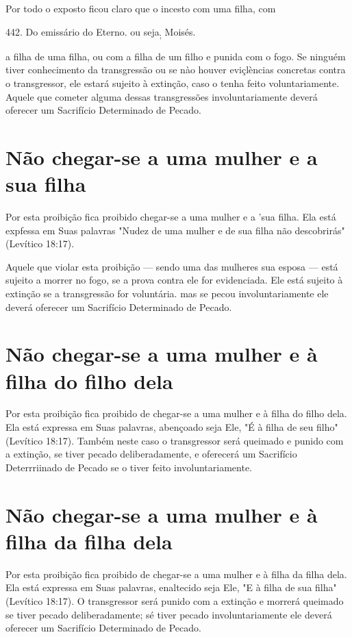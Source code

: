 Por todo o exposto ficou claro que o incesto com uma filha, com


442. Do emissário do Eterno. ou seja\textsubscript{;} Moisés.

a filha de uma filha, ou com a filha de um filho e punida com o fogo. Se
nin­guém tiver conhecimento da transgressão ou se nào houver eviçlèncias
concre­tas contra o transgressor, ele estará sujeito à extinção, caso o
tenha feito volun­tariamente. Aquele que cometer alguma dessas
transgressões involuntariamen­te deverá oferecer um Sacrifício
Determinado de Pecado.

\section{Não chegar-se a uma mulher e a sua filha}

Por esta proibição fica proibido chegar-se a uma mulher e a 'sua fi­lha.
Ela está expfessa em Suas palavras "Nudez de uma mulher e de sua filha
não descobrirás" (Levítico 18:17).

Aquele que violar esta proibição --- sendo uma das mulheres sua es­posa
--- está sujeito a morrer no fogo, se a prova contra ele for
evidenciada. Ele está sujeito à extinção se a transgressão for
voluntária. mas se pecou invo­luntariamente ele deverá oferecer um
Sacrifício Determinado de Pecado.

\section{Não chegar-se a uma mulher e à filha do filho dela}

Por esta proibição fica proibido de chegar-se a uma mulher e à filha do
filho dela. Ela está expressa em Suas palavras, abençoado seja Ele, "É à
filha de seu filho" (Levítico 18:17). Também neste caso o transgressor
será queima­do e punido com a extinção, se tiver pecado deliberadamente,
e oferecerá um Sacrifício Deterrriinado de Pecado se o tiver feito
involuntariamente.

\section{Não chegar-se a uma mulher e à filha da filha dela}

Por esta proibição fica proibido de chegar-se a uma mulher e à filha da
filha dela. Ela está expressa em Suas palavras, enaltecido seja Ele, "E
à filha de sua filha" (Levítico 18:17). O transgressor será punido com a
extinção e mor­rerá queimado se tiver pecado deliberadamente; sé tiver
pecado involuntaria­mente ele deverá oferecer um Sacrifício Determinado
de Pecado.

